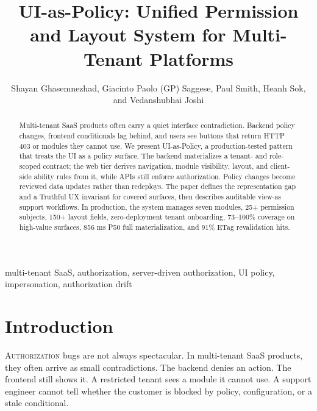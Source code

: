 \documentclass[10pt,journal]{IEEEtran}
\newcommand{\uiPolicy}{UI-as-Policy}
\begin{document}
\title{UI-as-Policy: Unified Permission and Layout System for Multi-Tenant Platforms}

\author{Shayan Ghasemnezhad, Giacinto Paolo (GP) Saggese, Paul Smith, Heanh Sok, and Vedanshubhai Joshi}


\maketitle


\begin{abstract}
Multi-tenant SaaS products often carry a quiet interface contradiction. Backend policy changes, frontend conditionals lag behind, and users see buttons that return HTTP 403 or modules they cannot use. We present \uiPolicy{}, a production-tested pattern that treats the UI as a policy surface. The backend materializes a tenant- and role-scoped contract; the web tier derives navigation, module visibility, layout, and client-side ability rules from it, while APIs still enforce authorization. Policy changes become reviewed data updates rather than redeploys. The paper defines the representation gap and a Truthful UX invariant for covered surfaces, then describes auditable view-as support workflows. In production, the system manages seven modules, 25+ permission subjects, 150+ layout fields, zero-deployment tenant onboarding, 73--100\% coverage on high-value surfaces, 856 ms P50 full materialization, and 91\% ETag revalidation hits.
\end{abstract}

\begin{IEEEkeywords}
multi-tenant SaaS, authorization, server-driven authorization, UI policy,
impersonation, authorization drift
\end{IEEEkeywords}


\section{Introduction}

\lettrine[lines=2]{A}{uthorization} bugs are not always spectacular. In multi-tenant SaaS products, they often arrive as small contradictions. The backend denies an action. The frontend still shows it. A restricted tenant sees a module it cannot use. A support engineer cannot tell whether the customer is blocked by policy, configuration, or a stale conditional.
\end{document}
